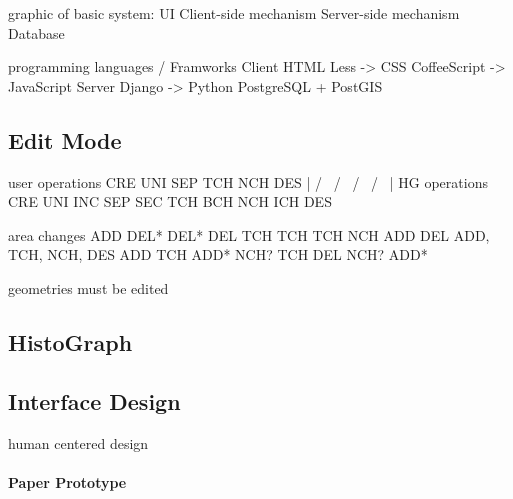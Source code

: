 graphic of basic system:
UI
Client-side mechanism
Server-side mechanism
Database

programming languages / Framworks
Client                    HTML
          Less ->         CSS
          CoffeeScript -> JavaScript
Server    Django ->       Python
                          PostgreSQL
                          + PostGIS


\subsection{Edit Mode} %
\label{sub:edit_mode}


user operations     CRE     UNI          SEP         TCH         NCH      DES
                     |      / \         /   \        /  \       /   \      |
HG operations       CRE   UNI   INC   SEP   SEC   TCH   BCH   NCH   ICH   DES

area changes        ADD   DEL*  DEL*  DEL   TCH   TCH   TCH   NCH   ADD   DEL
ADD, TCH, NCH, DES        ADD   TCH   ADD*  NCH?        TCH         DEL
                                NCH?        ADD*


geometries must be edited




\subsection{HistoGraph} %
\label{sub:histograph}




\subsection{Interface Design} %
\label{sub:interface_design}

human centered design

\paragraph{Paper Prototype} %
\label{par:paper_prototype}

